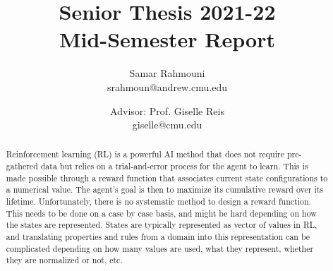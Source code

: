 \documentclass[a4paper,11pt]{article}
\author{%
  \begin{minipage}[t]{0.47\textwidth}
    \centering
    Samar Rahmouni \\ srahmoun@andrew.cmu.edu
  \end{minipage}
  \and
  \begin{minipage}[t]{0.45\textwidth}
    \centering
    Advisor: Prof. Giselle Reis \\ giselle@cmu.edu
  \end{minipage}%
  \vspace*{2ex}
}
\date{}
\title{{\Large\sc Senior Thesis 2021-22\\[2ex]}{\LARGE\bf Mid-Semester Report\vspace*{3ex}}}
\theoremstyle{definition}
\begin{document}
\maketitle 

\begin{abstract} 


  Reinforcement learning (RL) is a powerful AI method that does not
  require pre-gathered data but relies on a trial-and-error process
  for the agent to learn. 
  This is made possible through a reward function that associates
  current state configurations to a numerical value. 
  The agent's goal is then to maximize its cumulative reward over its
  lifetime. 
  Unfortunately, there is no systematic method to design a reward
  function.
  This needs to be done on a case by case basis, and might be hard
  depending on how the states are represented.
  States are typically represented as vector of values in RL, and
  translating properties and rules from a domain into this
  representation can be complicated depending on how many values are
  used, what they represent, whether they are normalized or not, etc.






\end{abstract}
\end{document}
